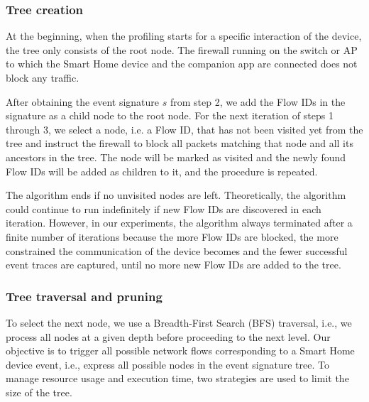 \subsubsection{Tree creation}

At the beginning, when the profiling starts for a specific interaction of the device, the tree only consists of the root node. The firewall running on the switch or AP to which the Smart Home device and the companion app are connected does not block any traffic.

After obtaining the event signature $s$ from step 2, we add the Flow IDs in the signature as a child node to the root node.
For the next iteration of steps 1 through 3, we select a node, i.e. a Flow ID, that has not been visited yet from the tree and instruct the firewall to block all packets matching that node and all its ancestors in the tree. The node will be marked as visited and the newly found Flow IDs will be added as children to it, and the procedure is repeated.

The algorithm ends if no unvisited nodes are left. Theoretically, the algorithm could continue to run indefinitely if new Flow IDs are discovered in each iteration. However, in our experiments, the algorithm always terminated after a finite number of iterations because the more Flow IDs are blocked, the more constrained the communication of the device becomes and the fewer successful event traces are captured, until no more new Flow IDs are added to the tree.

\subsubsection{Tree traversal and pruning}

To select the next node,
we use a Breadth-First Search (BFS) \cite{algorithms-book} traversal,
i.e., we process all nodes at a given depth before proceeding to the next level.
Our objective is to trigger all possible network flows corresponding to a Smart Home device event, i.e., express all possible nodes in the event signature tree.
To manage resource usage and execution time, two strategies are used to limit the size of the tree.

